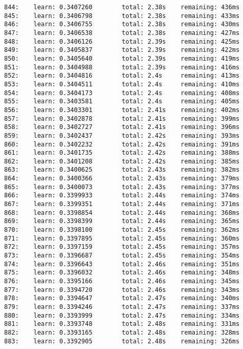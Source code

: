 \documentclass[11pt]{article}
\begin{document}
\begin{Verbatim}[commandchars=\\\{\}]
844:    learn: 0.3407260        total: 2.38s    remaining: 436ms
845:    learn: 0.3406798        total: 2.38s    remaining: 433ms
846:    learn: 0.3406755        total: 2.38s    remaining: 430ms
847:    learn: 0.3406538        total: 2.38s    remaining: 427ms
848:    learn: 0.3406126        total: 2.39s    remaining: 425ms
849:    learn: 0.3405837        total: 2.39s    remaining: 422ms
850:    learn: 0.3405640        total: 2.39s    remaining: 419ms
851:    learn: 0.3404988        total: 2.39s    remaining: 416ms
852:    learn: 0.3404816        total: 2.4s     remaining: 413ms
853:    learn: 0.3404511        total: 2.4s     remaining: 410ms
854:    learn: 0.3404173        total: 2.4s     remaining: 408ms
855:    learn: 0.3403581        total: 2.4s     remaining: 405ms
856:    learn: 0.3403301        total: 2.41s    remaining: 402ms
857:    learn: 0.3402878        total: 2.41s    remaining: 399ms
858:    learn: 0.3402727        total: 2.41s    remaining: 396ms
859:    learn: 0.3402437        total: 2.42s    remaining: 393ms
860:    learn: 0.3402232        total: 2.42s    remaining: 391ms
861:    learn: 0.3401735        total: 2.42s    remaining: 388ms
862:    learn: 0.3401208        total: 2.42s    remaining: 385ms
863:    learn: 0.3400625        total: 2.43s    remaining: 382ms
864:    learn: 0.3400366        total: 2.43s    remaining: 379ms
865:    learn: 0.3400073        total: 2.43s    remaining: 377ms
866:    learn: 0.3399933        total: 2.44s    remaining: 374ms
867:    learn: 0.3399351        total: 2.44s    remaining: 371ms
868:    learn: 0.3398854        total: 2.44s    remaining: 368ms
869:    learn: 0.3398399        total: 2.44s    remaining: 365ms
870:    learn: 0.3398100        total: 2.45s    remaining: 362ms
871:    learn: 0.3397895        total: 2.45s    remaining: 360ms
872:    learn: 0.3397159        total: 2.45s    remaining: 357ms
873:    learn: 0.3396687        total: 2.45s    remaining: 354ms
874:    learn: 0.3396643        total: 2.46s    remaining: 351ms
875:    learn: 0.3396032        total: 2.46s    remaining: 348ms
876:    learn: 0.3395166        total: 2.46s    remaining: 345ms
877:    learn: 0.3394720        total: 2.46s    remaining: 343ms
878:    learn: 0.3394647        total: 2.47s    remaining: 340ms
879:    learn: 0.3394246        total: 2.47s    remaining: 337ms
880:    learn: 0.3393999        total: 2.47s    remaining: 334ms
881:    learn: 0.3393748        total: 2.48s    remaining: 331ms
882:    learn: 0.3393165        total: 2.48s    remaining: 328ms
883:    learn: 0.3392905        total: 2.48s    remaining: 326ms

\end{Verbatim}
\end{document}
